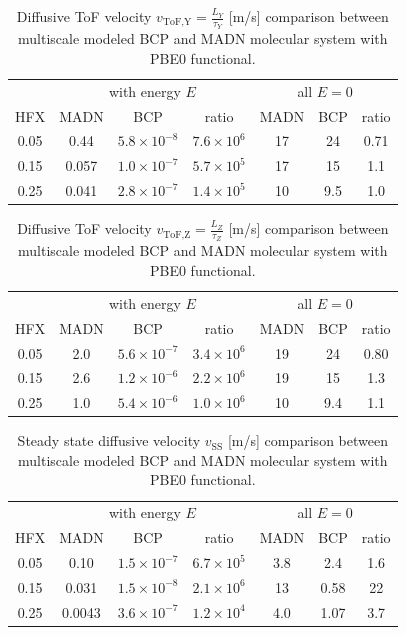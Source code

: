 \documentclass[letterpaper,12pt]{article}
\begin{document}
\begin{table}[H]
\centering
\begin{tabular}{c c c c c c c}
    \toprule
        &
        \multicolumn{3}{c}{ with energy $E$} &
        \multicolumn{3}{c}{all $E=0$}  \\
    HFX & MADN & BCP & ratio & MADN & BCP & ratio  \\
    \cmidrule(r){1-7}
    0.05 & 0.44 & $5.8 \times 10^{-8}$ & $7.6 \times 10^{6}$ & 17 & 24 & 0.71 \\
    0.15 & 0.057& $1.0 \times 10^{-7}$  & $5.7 \times 10^{5}$ & 17 & 15 & 1.1 \\
    0.25 & 0.041 & $2.8 \times 10^{-7}$ & $1.4 \times 10^{5}$ & 10 & 9.5 & 1.0 \\
    \bottomrule
    \end{tabular}
    \caption{Diffusive ToF velocity $v_\text{ToF,Y}=\frac{L_Y}{\tau_Y}$ [m/s] comparison between multiscale modeled BCP and MADN molecular system with PBE0 functional. }
    \label{tab:compare_Ly}
\end{table}

\begin{table}[H]
\centering
\begin{tabular}{c c c c c c c}
    \toprule
        &
        \multicolumn{3}{c}{ with energy $E$} &
        \multicolumn{3}{c}{all $E=0$}  \\
    HFX & MADN & BCP & ratio & MADN & BCP & ratio  \\
    \cmidrule(r){1-7}
    0.05 & 2.0 & $5.6 \times 10^{-7}$ & $3.4 \times 10^{6}$ & 19 & 24 & 0.80 \\
    0.15 & 2.6 & $1.2 \times 10^{-6}$ & $2.2 \times 10^{6}$ & 19 & 15 & 1.3 \\
    0.25 & 1.0 & $5.4 \times 10^{-6}$ & $1.0 \times 10^{6}$ & 10 & 9.4 & 1.1 \\
    \bottomrule
    \end{tabular}
    \caption{Diffusive ToF velocity $v_\text{ToF,Z}=\frac{L_Z}{\tau_Z}$ [m/s] comparison between multiscale modeled BCP and MADN molecular system with PBE0 functional. }
    \label{tab:compare_Lz}
\end{table}

\begin{table}[htbp]
\centering
\begin{tabular}{c c c c c c c}
    \toprule
        &
        \multicolumn{3}{c}{ with energy $E$} &
        \multicolumn{3}{c}{all $E=0$}  \\
    HFX & MADN & BCP & ratio & MADN & BCP & ratio  \\
    \cmidrule(r){1-7}
    0.05 & 0.10 & $1.5 \times 10^{-7}$ & $6.7 \times 10^{5}$ & 3.8 & 2.4 & 1.6 \\
    0.15 & 0.031 & $1.5 \times 10^{-8}$ & $2.1 \times 10^{6}$ & 13 & 0.58 & 22 \\
    0.25 & 0.0043 & $3.6 \times 10^{-7}$ & $1.2 \times 10^{4}$ & 4.0 & 1.07 & 3.7 \\
    \bottomrule
    \end{tabular}
    \caption{Steady state diffusive velocity $v_\text{SS}$ [m/s] comparison between multiscale modeled BCP and MADN molecular system with PBE0 functional. }
    \label{tab:compare_SS}
\end{table}
\end{document}
